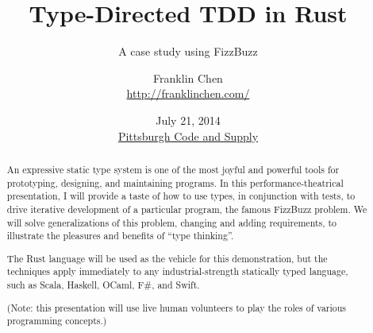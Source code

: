 {
}

\usepackage[utf8]{inputenc}

\usepackage[cache]{minted}


\title{Type-Directed TDD in Rust}
\subtitle{A case study using FizzBuzz}
\author{Franklin Chen \\ \url{http://franklinchen.com/}}
\date[\href{http://www.meetup.com/Pittsburgh-Code-Supply/events/183483622/}{Pittsburgh Code and Supply}]{July 21, 2014 \\ \href{http://www.meetup.com/Pittsburgh-Code-Supply/events/183483622/}{Pittsburgh Code and Supply}}

\subject{Talks}




\maketitle

\begin{abstract}
  An expressive static type system is one of the most joyful and
  powerful tools for prototyping, designing, and maintaining
  programs. In this performance-theatrical presentation, I will
  provide a taste of how to use types, in conjunction with tests, to
  drive iterative development of a particular program, the famous
  FizzBuzz problem. We will solve generalizations of this problem,
  changing and adding requirements, to illustrate the pleasures and
  benefits of ``type thinking''.

  The Rust language will be used as the vehicle for this
  demonstration, but the techniques apply immediately to any
  industrial-strength statically typed language, such as Scala, Haskell,
  OCaml, F\#, and Swift.

  (Note: this presentation will use live human volunteers to play the
  roles of various programming concepts.)
\end{abstract}

\begin{frame}
  \titlepage
\end{frame}

